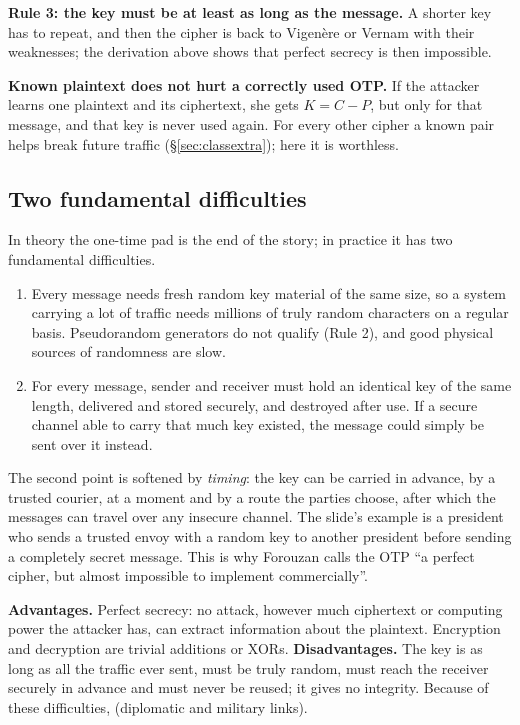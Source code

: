 \textbf{Rule 3: the key must be at least as long as the message.} A shorter key has to repeat, and then the cipher is back to Vigen\`ere or Vernam with their weaknesses; the derivation above shows that perfect secrecy is then impossible.

\textbf{Known plaintext does not hurt a correctly used OTP.} If the attacker learns one plaintext and its ciphertext, she gets $K = C - P$, but only for that message, and that key is never used again. For every other cipher a known pair helps break future traffic (\S\ref{sec:classextra}); here it is worthless.

\subsection{Two fundamental difficulties}
In theory the one-time pad is the end of the story; in practice it has two fundamental difficulties.
\begin{enumerate}[leftmargin=1.5em]
  \item {} Every message needs fresh random key material of the same size, so a system carrying a lot of traffic needs millions of truly random characters on a regular basis. Pseudorandom generators do not qualify (Rule 2), and good physical sources of randomness are slow.
  \item {} For every message, sender and receiver must hold an identical key of the same length, delivered and stored securely, and destroyed after use. If a secure channel able to carry that much key existed, the message could simply be sent over it instead.
\end{enumerate}
The second point is softened by \emph{timing}: the key can be carried in advance, by a trusted courier, at a moment and by a route the parties choose, after which the messages can travel over any insecure channel. The slide's example is a president who sends a trusted envoy with a random key to another president before sending a completely secret message. This is why Forouzan calls the OTP ``a perfect cipher, but almost impossible to implement commercially''.

\textbf{Advantages.} Perfect secrecy: no attack, however much ciphertext or computing power the attacker has, can extract information about the plaintext. Encryption and decryption are trivial additions or XORs. \textbf{Disadvantages.} The key is as long as all the traffic ever sent, must be truly random, must reach the receiver securely in advance and must never be reused; it gives no integrity. Because of these difficulties,  (diplomatic and military links).

